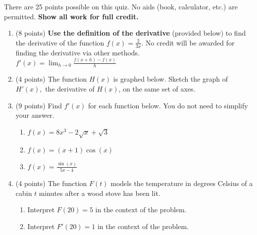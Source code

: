 \documentclass[12pt]{article}
\renewcommand{\emph}[1]{\textsf{\textbf{#1}}}
\newcommand{\ds}{\displaystyle}
\begin{document}

There are 25 points possible on this quiz. No aids (book, calculator, etc.)
are permitted.  {\bf Show all work for full credit.}

\begin{enumerate}
\item (8 points) \emph{Use the definition of the derivative} (provided below) to find the derivative of the function $\ds f(x)= \frac{2}{3x}.$ No credit will be awarded for finding the derivative via other methods.\\

$\ds f'(x)=\lim_{h \to 0} \frac{f(x+h) - f(x)}{h}$

\vfill

\item (4 points) The function $H(x)$ is graphed below. Sketch the graph of $H'(x),$ the derivative of $H(x)$, on the same set of axes.\\

\begin{center}
\end{center}

\newpage
\item (9 points) Find $f'(x)$ for each function below. You do not need to simplify your answer.
	\begin{enumerate}
	\item $f(x)=8x^3-2\sqrt{x}+\sqrt{3}$
	\vfill
	\item $f(x)=(x+1)\cos(x)$
	\vfill
	\item $f(x)=\frac{\sin(x)}{5x-4}$
	\vfill
	\end{enumerate}
\item (4 points) The function $F(t)$ models the temperature  in degrees Celsius of a cabin $t$ minutes after a wood stove has been lit. 
	\begin{enumerate}
	\item Interpret  $F(20)=5$ in the context of the problem.
	\vspace{.7in}
	\item Interpret $F'(20)=1$ in the context of the problem.
	\vspace{.7in}
	\end{enumerate}
\end{enumerate}
\end{document}
